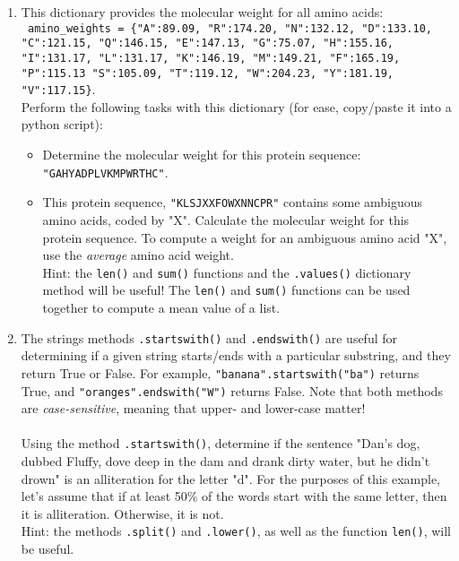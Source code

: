\documentclass{article}[12pt]
\newcommand{\code}[1]{\texttt{#1}}  %
\begin{document}
\begin{enumerate}[itemsep=5ex]
	\item This dictionary provides the molecular weight for all amino acids: \\ \code{ amino\_weights = \{"A":89.09, "R":174.20, "N":132.12, "D":133.10, "C":121.15, "Q":146.15, "E":147.13, "G":75.07, "H":155.16, "I":131.17, "L":131.17, "K":146.19, "M":149.21, "F":165.19, "P":115.13 "S":105.09, "T":119.12, "W":204.23, "Y":181.19, "V":117.15\}}. \\ Perform the following tasks with this dictionary (for ease, copy/paste it into a python script):
	\begin{itemize}
		\item Determine the molecular weight for this protein sequence: \\ \code{"GAHYADPLVKMPWRTHC"}.
		\item This protein sequence, \code{"KLSJXXFOWXNNCPR"} contains some ambiguous amino acids, coded by "X". Calculate the molecular weight for this protein sequence. To compute a weight for an ambiguous amino acid "X", use the \emph{average} amino acid weight. \\ Hint: the \code{len()} and \code{sum()} functions and the \code{.values()} dictionary method will be useful! The \code{len()} and \code{sum()} functions can be used together to compute a mean value of a list.
		
	\end{itemize}
	
	
	\item The strings methods \code{.startswith()} and \code{.endswith()} are useful for determining if a given string starts/ends with a particular substring, and they return True or False. For example, \code{"banana".startswith("ba")} returns True, and \code{"oranges".endswith("W")} returns False. Note that both methods are \emph{case-sensitive}, meaning that upper- and lower-case matter! \\\\ Using the method \code{.startswith()}, determine if the sentence "Dan's dog, dubbed Fluffy, dove deep in the dam and drank dirty water, but he didn't drown" is an alliteration for the letter "d". For the purposes of this example, let's assume that if at least 50\% of the words start with the same letter, then it is alliteration. Otherwise, it is not. 
	\\ Hint: the methods \code{.split()} and \code{.lower()}, as well as the function \code{len()}, will be useful.


\end{enumerate}
\end{document}

